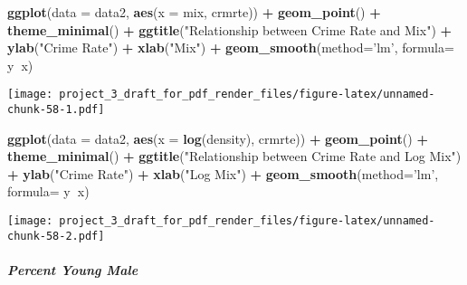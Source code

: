 \documentclass[]{article}
\newenvironment{Shaded}{\begin{snugshade}}{\end{snugshade}}
\newcommand{\DataTypeTok}[1]{\textcolor[rgb]{0.13,0.29,0.53}{#1}}
\newcommand{\KeywordTok}[1]{\textcolor[rgb]{0.13,0.29,0.53}{\textbf{#1}}}
\newcommand{\NormalTok}[1]{#1}
\newcommand{\OperatorTok}[1]{\textcolor[rgb]{0.81,0.36,0.00}{\textbf{#1}}}
\newcommand{\StringTok}[1]{\textcolor[rgb]{0.31,0.60,0.02}{#1}}
\let\oldsubparagraph\subparagraph
\renewcommand{\subparagraph}[1]{\oldsubparagraph{#1}\mbox{}}
\begin{document}
\begin{Shaded}
\begin{Highlighting}[]
\KeywordTok{ggplot}\NormalTok{(}\DataTypeTok{data =}\NormalTok{ data2, }\KeywordTok{aes}\NormalTok{(}\DataTypeTok{x =}\NormalTok{ mix, crmrte)) }\OperatorTok{+}
\StringTok{  }\KeywordTok{geom_point}\NormalTok{() }\OperatorTok{+}
\StringTok{  }\KeywordTok{theme_minimal}\NormalTok{() }\OperatorTok{+}
\StringTok{  }\KeywordTok{ggtitle}\NormalTok{(}\StringTok{"Relationship between Crime Rate and Mix"}\NormalTok{) }\OperatorTok{+}\StringTok{ }
\StringTok{  }\KeywordTok{ylab}\NormalTok{(}\StringTok{"Crime Rate"}\NormalTok{) }\OperatorTok{+}\StringTok{ }\KeywordTok{xlab}\NormalTok{(}\StringTok{"Mix"}\NormalTok{) }\OperatorTok{+}
\StringTok{  }\KeywordTok{geom_smooth}\NormalTok{(}\DataTypeTok{method=}\StringTok{'lm'}\NormalTok{, }\DataTypeTok{formula=}\NormalTok{ y}\OperatorTok{~}\NormalTok{x)}
\end{Highlighting}
\end{Shaded}

\texttt{[image: project\_3\_draft\_for\_pdf\_render\_files/figure-latex/unnamed-chunk-58-1.pdf]}

\begin{Shaded}
\begin{Highlighting}[]
\KeywordTok{ggplot}\NormalTok{(}\DataTypeTok{data =}\NormalTok{ data2, }\KeywordTok{aes}\NormalTok{(}\DataTypeTok{x =} \KeywordTok{log}\NormalTok{(density), crmrte)) }\OperatorTok{+}
\StringTok{  }\KeywordTok{geom_point}\NormalTok{() }\OperatorTok{+}
\StringTok{  }\KeywordTok{theme_minimal}\NormalTok{() }\OperatorTok{+}
\StringTok{  }\KeywordTok{ggtitle}\NormalTok{(}\StringTok{"Relationship between Crime Rate and Log Mix"}\NormalTok{) }\OperatorTok{+}\StringTok{ }
\StringTok{  }\KeywordTok{ylab}\NormalTok{(}\StringTok{"Crime Rate"}\NormalTok{) }\OperatorTok{+}\StringTok{ }\KeywordTok{xlab}\NormalTok{(}\StringTok{"Log Mix"}\NormalTok{) }\OperatorTok{+}
\StringTok{  }\KeywordTok{geom_smooth}\NormalTok{(}\DataTypeTok{method=}\StringTok{'lm'}\NormalTok{, }\DataTypeTok{formula=}\NormalTok{ y}\OperatorTok{~}\NormalTok{x)}
\end{Highlighting}
\end{Shaded}

\texttt{[image: project\_3\_draft\_for\_pdf\_render\_files/figure-latex/unnamed-chunk-58-2.pdf]}

\hypertarget{percent-young-male}{%
\subparagraph{Percent Young Male}\label{percent-young-male}}
\end{document}
